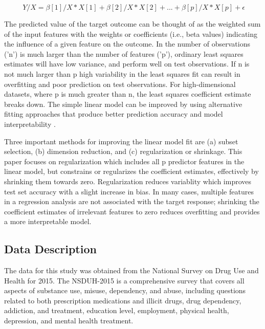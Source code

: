 \documentclass[sigconf]{acmart}
\begin{document}
\begin{equation}
  \ Y/X = \beta[1]/X*X[1] + \beta[2]/X*X[2] +... + \beta[p]/X*X[p] + \epsilon
\end{equation}

The predicted value of the target outcome can be thought of as the weighted 
sum of the input features with the weights or coefficients (i.e., beta values) 
indicating the influence of a given feature on the outcome. In the number of
observations ('n') is much larger than the number of features ('p'), ordinary 
least squares estimates will have low variance, and perform well on test
observations. If n is not much larger than p high variability in the least
squares fit can result in overfitting and poor prediction on test observations.
For high-dimensional datasets, where p is much greater than n, the least
squares coefficient estimate breaks down. The simple linear model can be
improved by using alternative fitting approaches that produce better 
prediction accuracy and model interpretability \cite{statlearn13}. 

Three
important methods for improving the linear model fit are (a) subset selection,
(b) dimension reduction, and (c) regularization or shrinkage. This paper 
focuses on regularization which includes all p predictor features in the
linear model, but constrains or regularizes the coefficient estimates, 
effectively by shrinking them towards zero. Regularization reduces variablity 
which improves test set accuracy with a slight increase in bias. In many cases, 
multiple features in a regression analysis are not associated with the target
response; shrinking the coefficient estimates of irrelevant features to zero 
reduces overfitting and provides a more interpretable model. 


\subsection{Data Description} 

The data for this study was obtained from the National Survey on Drug Use 
and Health for 2015. The NSDUH-2015 is a comprehensive survey that covers 
all aspects of substance use, misuse, dependency, and abuse, including 
questions related to both prescription medications and illicit drugs, drug 
dependency, addiction, and treatment, education level, employment, physical 
health, depression, and mental health treatment. 
\end{document}
